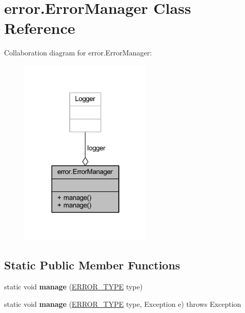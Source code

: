 \hypertarget{classerror_1_1_error_manager}{\section{error.\-Error\-Manager Class Reference}
\label{classerror_1_1_error_manager}
}


Collaboration diagram for error.\-Error\-Manager\-:
\nopagebreak
\begin{figure}[H]
\begin{center}
\leavevmode
\includegraphics[width=178pt]{classerror_1_1_error_manager__coll__graph}
\end{center}
\end{figure}
\subsection*{Static Public Member Functions}
\begin{DoxyCompactItemize}
\item 
\hypertarget{classerror_1_1_error_manager_a22faa52ee5734184fa446591fd45ba7f}{static void {\bfseries manage} (\hyperlink{enumerror_1_1_e_r_r_o_r___t_y_p_e}{E\-R\-R\-O\-R\-\_\-\-T\-Y\-P\-E} type)}\label{classerror_1_1_error_manager_a22faa52ee5734184fa446591fd45ba7f}

\item 
\hypertarget{classerror_1_1_error_manager_aa17e91fab94fd42d865e53eaec80e2cb}{static void {\bfseries manage} (\hyperlink{enumerror_1_1_e_r_r_o_r___t_y_p_e}{E\-R\-R\-O\-R\-\_\-\-T\-Y\-P\-E} type, Exception e)  throws Exception}\label{classerror_1_1_error_manager_aa17e91fab94fd42d865e53eaec80e2cb}

\end{DoxyCompactItemize}
